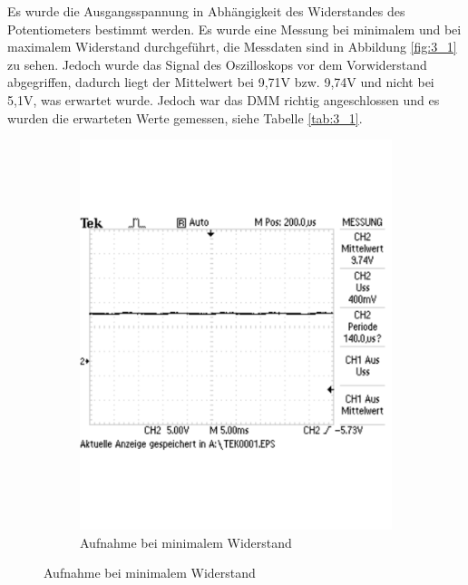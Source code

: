 \documentclass[12pt,a4paper]{article}
\begin{document}
Es wurde die Ausgangsspannung in Abhängigkeit des Widerstandes des Potentiometers bestimmt werden. Es wurde eine Messung bei minimalem und bei maximalem Widerstand durchgeführt, die Messdaten sind in Abbildung \ref{fig:3_1} zu sehen. Jedoch wurde das Signal des Oszilloskops vor dem Vorwiderstand abgegriffen, dadurch liegt der Mittelwert bei 9,71V bzw. 9,74V und nicht bei 5,1V, was erwartet wurde. Jedoch war das DMM richtig angeschlossen und es wurden die erwarteten Werte gemessen, siehe Tabelle \ref{tab:3_1}.

\begin{figure}[H]
        \centering
        \begin{subfigure}[b]{0.48\textwidth}
                \includegraphics[width=\textwidth , scale = 0.4]{3_1_1.pdf}
                \caption[Aufnahme bei minimalem Widerstand]{Aufnahme bei minimalem Widerstand}
 				 \label{fig:3_1_1}
        \end{subfigure}%

\end{figure}
\end{document}
